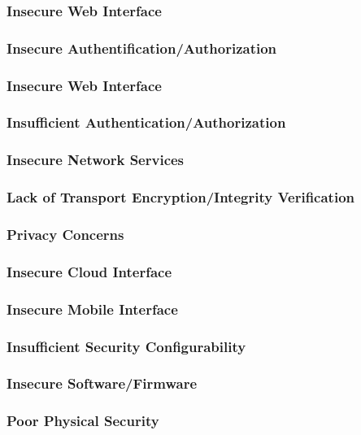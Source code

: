     \subsubsection*{Insecure Web Interface}
    \subsubsection*{Insecure Authentification/Authorization}
    \subsubsection*{Insecure Web Interface}
    \subsubsection*{Insufficient Authentication/Authorization}
    \subsubsection*{Insecure Network Services}
    \subsubsection*{Lack of Transport Encryption/Integrity Verification}
    \subsubsection*{Privacy Concerns}
    \subsubsection*{Insecure Cloud Interface}
    \subsubsection*{Insecure Mobile Interface}
    \subsubsection*{Insufficient Security Configurability}
    \subsubsection*{Insecure Software/Firmware}
    \subsubsection*{Poor Physical Security}
    